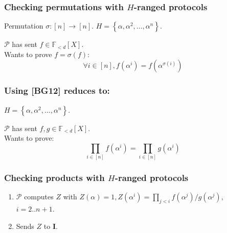 \documentclass[shadesubsections,trans,14pt,mathserif]{beamer}
\newcommand{\F}{\ensuremath{\mathbb F}}
\newcommand{\set}[1]{\ensuremath{\left\{#1\right\}}}
\newcommand{\prv}{\ensuremath{\mathcal{P}}}
\newcommand{\polysofdeg}[1]{\F_{< #1}[X]}
\newcommand{\ideal}{\mathbf{I}}
\newcommand{\gen}{\alpha}
\begin{document}
\begin{frame}
\frametitle{Checking permutations with $H$-ranged protocols}   %
 Permutation $\sigma: [n]\to [n]$.
 $H=\set{\gen,\gen^2,\ldots,\gen^n}$.\\
 \vspace{0.2in}
 
 $\prv$ has sent $f\in \polysofdeg{d}$.\\
 \vspace{0.2in}
 Wants to prove $f=\sigma(f)$:
 \[\forall i\in [n], f(\gen^i) = f(\gen^{\sigma(i)})\]

 

\end{frame}
\begin{frame}
\frametitle{Using [BG12] reduces to:}   %
 $H=\set{\gen,\gen^2,\ldots,\gen^n}$.\\
 \vspace{0.2in}
 
 $\prv$ has sent $f,g\in \polysofdeg{d}$.\\
 \vspace{0.2in}
 Wants to prove:
 \[\prod_{i\in [n]}  f(\gen^i) = \prod_{i\in [n]} g(\gen^i)\]

 

\end{frame}




\begin{frame}
\frametitle{Checking products with $H$-ranged protocols}   %
 \begin{enumerate}
  \item $\prv$ computes $Z$ with 
  $ Z(\gen)=1, Z(\gen^i) = \prod_{j<i}  f(\gen^j)/g(\gen^j)$, {\small{$i=2..n+1$}}.
  \item Sends $Z$ to $\ideal$.

 \end{enumerate}


\end{frame}
\end{document}

